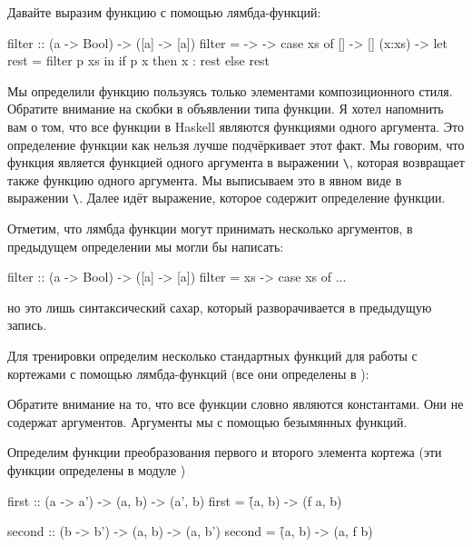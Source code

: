 Давайте выразим функцию  с помощью лямбда-функций:

\begin{code}
filter :: (a -> Bool) -> ([a] -> [a])
filter = \p -> \xs -> case xs of
    []     -> []
    (x:xs) -> let rest = filter p xs
              in  if   p x
                  then x : rest
                  else rest
\end{code}

Мы определили функцию  пользуясь только 
элементами композиционного стиля. Обратите внимание
на скобки в объявлении типа функции. Я хотел напомнить
вам о том, что все функции в Haskell  являются функциями
одного аргумента. Это определение функции 
как нельзя лучше подчёркивает этот факт. Мы говорим,
что  функция  является функцией одного аргумента
 в выражении \verb!\!, которая
возвращает также функцию одного аргумента. Мы выписываем
это в явном виде в выражении \verb!\!.
Далее идёт выражение, которое содержит определение функции. 

Отметим, что лямбда функции могут принимать несколько 
аргументов, в предыдущем определении мы могли бы написать:


\begin{code}
filter :: (a -> Bool) -> ([a] -> [a])
filter = \p xs -> case xs of
    ...
\end{code}

\noindent но это лишь синтаксический сахар, который разворачивается
в предыдущую запись.

Для тренировки определим несколько стандартных функций
для работы с кортежами с помощью лямбда-функций (все они
определены в ):


Обратите внимание на то, что все функции словно являются
константами. Они не содержат аргументов. Аргументы мы 
с помощью безымянных функций. 

Определим функции преобразования первого и второго
элемента кортежа (эти функции определены в модуле  )

\begin{code}
first :: (a -> a') -> (a, b) -> (a', b)
first = \f (a, b) -> (f a, b)

second :: (b -> b') -> (a, b) -> (a, b')
second = \f (a, b) -> (a, f b)
\end{code}

